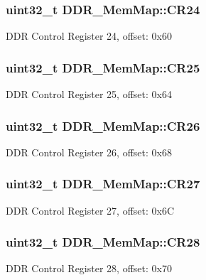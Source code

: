 \subsubsection[{C\+R24}]{\setlength{\rightskip}{0pt plus 5cm}uint32\+\_\+t D\+D\+R\+\_\+\+Mem\+Map\+::\+C\+R24}\label{struct_d_d_r___mem_map_a6fa5ddda992c02d241e62662e4cb1e5f}
D\+D\+R Control Register 24, offset\+: 0x60 \hypertarget{struct_d_d_r___mem_map_ae2dde4b2310e1ff0a2e48bc8bf857c1d}{}
\subsubsection[{C\+R25}]{\setlength{\rightskip}{0pt plus 5cm}uint32\+\_\+t D\+D\+R\+\_\+\+Mem\+Map\+::\+C\+R25}\label{struct_d_d_r___mem_map_ae2dde4b2310e1ff0a2e48bc8bf857c1d}
D\+D\+R Control Register 25, offset\+: 0x64 \hypertarget{struct_d_d_r___mem_map_a031e24300fa13e264decb3e337487428}{}
\subsubsection[{C\+R26}]{\setlength{\rightskip}{0pt plus 5cm}uint32\+\_\+t D\+D\+R\+\_\+\+Mem\+Map\+::\+C\+R26}\label{struct_d_d_r___mem_map_a031e24300fa13e264decb3e337487428}
D\+D\+R Control Register 26, offset\+: 0x68 \hypertarget{struct_d_d_r___mem_map_aa8c89b9e2534cf5bc5dd84a353c63449}{}
\subsubsection[{C\+R27}]{\setlength{\rightskip}{0pt plus 5cm}uint32\+\_\+t D\+D\+R\+\_\+\+Mem\+Map\+::\+C\+R27}\label{struct_d_d_r___mem_map_aa8c89b9e2534cf5bc5dd84a353c63449}
D\+D\+R Control Register 27, offset\+: 0x6\+C \hypertarget{struct_d_d_r___mem_map_a349bdd8a75e6c745d35909b64cb9af2c}{}
\subsubsection[{C\+R28}]{\setlength{\rightskip}{0pt plus 5cm}uint32\+\_\+t D\+D\+R\+\_\+\+Mem\+Map\+::\+C\+R28}\label{struct_d_d_r___mem_map_a349bdd8a75e6c745d35909b64cb9af2c}
D\+D\+R Control Register 28, offset\+: 0x70 \hypertarget{struct_d_d_r___mem_map_adee1e94d48aa891470fcc563ab5c5700}{}
